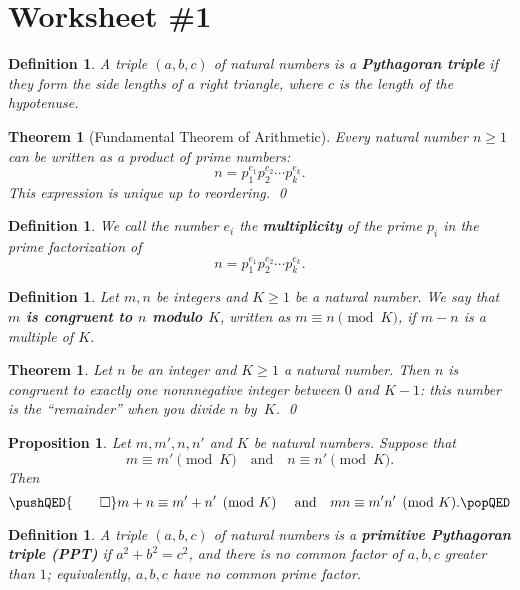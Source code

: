 \documentclass[12pt]{amsart}
\newcommand{\showsol}[1]{\def\displaysol{#1}}
\numberwithin{equation}{section}
\theoremstyle{plain} %
\newtheorem{thm}	[section]	{Theorem}
\newtheorem{prop}	[section]	{Proposition}
\newtheorem{defn}	[section]	{Definition}
\begin{document}
\showsol{0}
	
	\thispagestyle{empty}
	
	\section*{Worksheet \#1}
	
	\begin{defn} A triple $(a,b,c)$ of natural numbers is a \textbf{Pythagoran triple} if they form the side lengths of a right triangle, where $c$ is the length of the hypotenuse.
\end{defn}

\begin{thm}[Fundamental Theorem of Arithmetic] Every natural number $n\geq 1$ can be written as a product of prime numbers:
\[ n = p_1^{e_1} p_2^{e_2} \cdots p_k^{e_k}.\]
This expression is unique up to reordering. \qed
\end{thm}

\begin{defn} We call the number $e_i$ the \textbf{multiplicity} of the prime $p_i$ in the prime factorization of \[n=p_1^{e_1} p_2^{e_2} \cdots p_k^{e_k}.\]\end{defn}

	\begin{defn}  Let $m,n$ be integers and $K\geq 1$ be a natural number. We say that \textbf{$m$ is congruent to $n$ modulo $K$}, written as $m \equiv n \pmod K$, if $m-n$ is a multiple of $K$.\end{defn}


\begin{thm} Let $n$ be an integer and $K\geq 1$ a natural number. Then $n$ is congruent to exactly one nonnnegative integer between $0$ and $K-1$: this number is the ``remainder'' when you divide $n$ by~$K$. \qed
\end{thm}

\begin{prop} Let $m,m',n,n'$ and $K$ be natural numbers. Suppose that 
\[ m \equiv m' \pmod K \quad \text{and} \quad n\equiv n' \pmod K.\]
Then
\[ \pushQED{\qed} m+n \equiv m'+n' \pmod K \quad \text{ and} \quad mn \equiv m'n' \pmod K .\qedhere\popQED\]\end{prop}
	
\begin{defn}  A triple $(a,b,c)$ of natural numbers is a \textbf{primitive Pythagoran triple (PPT)} if ${a^2+b^2=c^2}$, and there is no common factor of $a,b,c$ greater than $1$; equivalently, $a,b,c$ have no common prime factor.
\end{defn}
\end{document}
